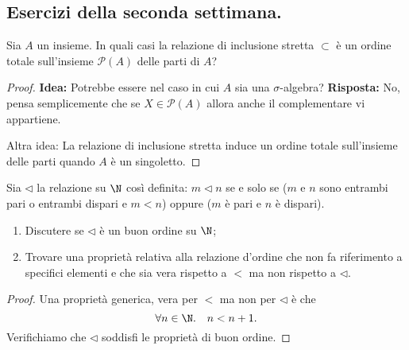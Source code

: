 \subsection{Esercizi della seconda settimana.}

\begin{exe}
  Sia \(A\) un insieme. In quali casi la relazione di inclusione stretta \(\subset\) è un ordine totale sull'insieme \(\mathcal{P}(A)\) delle parti di \(A\)?
\end{exe}
\begin{proof}
  {\bf Idea:} Potrebbe essere nel caso in cui \(A\) sia una \(\sigma\)-algebra?
  {\bf Risposta:} No, pensa semplicemente che se \(X \in \mathcal{P}(A)\) allora anche il complementare vi appartiene.

  Altra idea: La relazione di inclusione stretta induce un ordine totale sull'insieme delle parti quando \(A\) è un singoletto.
\end{proof}

\begin{exe}
  \label{exe:1}
  Sia \(\lhd\) la relazione su \(\N\) così definita: \(m \lhd n\) se e solo se (\(m\) e \(n\) sono entrambi pari o entrambi dispari e \(m < n\)) oppure (\(m\) è pari e \(n\) è dispari).
  \begin{enumerate}
    \item Discutere se \(\lhd\) è un buon ordine su \(\N\);
    \item Trovare una proprietà relativa alla relazione d'ordine che non fa riferimento a specifici elementi e che sia vera rispetto a \(<\) ma non rispetto a \(\lhd\).
  \end{enumerate}
\end{exe}
\begin{proof}
  Una proprietà generica, vera per \(<\) ma non per \(\lhd\) è che
  \[
  \forall n \in \N.\quad n < n+1.
  \]
  Verifichiamo che \(\lhd\) soddisfi le proprietà di buon ordine. %
\end{proof}

